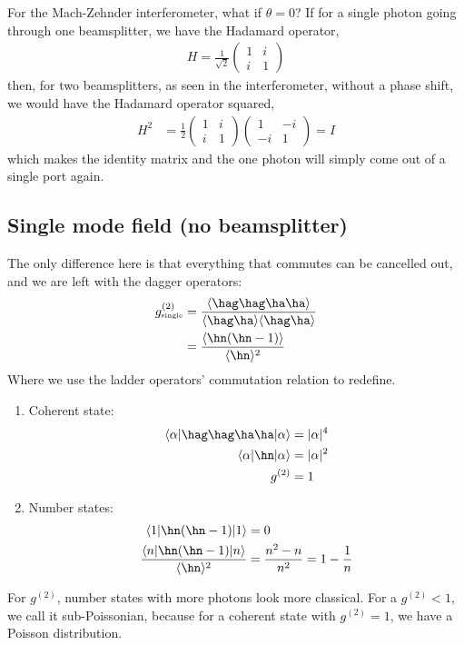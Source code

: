 \documentclass[a4paper, 11pt, normalem]{report}
\begin{document}
\chapter{}
For the Mach-Zehnder interferometer, what if $\theta=0$?
If for a single photon going through one beamsplitter, we have the Hadamard operator, 
\begin{align}
    H = \frac{1}{\sqrt{2}}\begin{pmatrix}1&i\\i&1\end{pmatrix}
\end{align}
then, for two beamsplitters, as seen in the interferometer, without a phase shift, we would have the Hadamard operator squared,
\begin{align}
    H^2 &= \frac12\begin{pmatrix}1&i\\i&1\end{pmatrix}\begin{pmatrix}1&-i\\-i&1\end{pmatrix} = I
\end{align}
which makes the identity matrix and the one photon will simply come out of a single port again. 

\section{Single mode field (no beamsplitter)}
The only difference here is that everything that commutes can be cancelled out, and we are left with the dagger operators:
\begin{align}
    g^{(2)}_{\text{\tiny single}} &= \frac{\langle\hag\hag\ha\ha\rangle}{\langle\hag\ha\rangle\langle\hag\ha\rangle} \\
                                  &=  \frac{\langle\hn(\hn-1)\rangle}{\langle\hn\rangle^2}
\end{align}
Where we use the ladder operators' commutation relation to redefine. 
\begin{enumerate}
    \item Coherent state:
        \begin{align}
            \langle\alpha|\hag\hag\ha\ha|\alpha\rangle &= |\alpha|^4 \\
            \langle\alpha|\hn|\alpha\rangle &= |\alpha|^2 \\
            g^{(2)} &= 1
        \end{align}
    \item Number states:
        \begin{align}
            \langle1|\hn(\hn-1)|1\rangle &= 0 \\
            \frac{\langle n|\hn(\hn-1)|n\rangle}{\langle\hn\rangle^2} &= \frac{n^2-n}{n^2} = 1-\frac{1}{n}
        \end{align}
\end{enumerate}
For $g^{(2)}$, number states with more photons look more classical. 
For a $g^{(2)}<1$, we call it sub-Poissonian, because for a coherent state with $g^{(2)}=1$, we have a Poisson distribution. 
\end{document}
